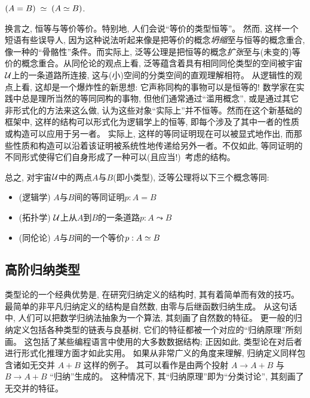 \begin{description}%
\item[泛等公理:]  $(A = B) \;\simeq\; (A \simeq B)$.
\end{description}
%
换言之, 恒等与等价等价。特别地, 人们会说``等价的类型恒等''。
然而, 这样一个短语有些误导人, 因为这种说法听起来像是把等价的概念\emph{坍缩}至与恒等的概念重合, 像一种的``骨骼性''条件。而实际上, 
泛等公理是把恒等的概念\emph{扩张}至与(未变的)等价的概念重合。从同伦论的观点上看, 泛等蕴含着具有相同同伦类型的空间被宇宙$\mathcal{U}$上的一条道路所连接, 这与(小)空间的分类空间的直观理解相符。
从逻辑性的观点上看, 这却是一个爆炸性的新思想: 它声称同构的事物可以是恒等的! 数学家在实践中总是理所当然的等同同构的事物, 但他们通常通过``滥用概念'', 
或是通过其它非形式化的方法来这么做, 认为这些对象``实际上''并不恒等。然而在这个新基础的框架中, 这样的结构可以形式化为逻辑学上的恒等, 即每个涉及了其中一者的性质或构造可以应用于另一者。
实际上, 这样的等同证明现在可以被显式地作出, 而那些性质和构造可以沿着该证明被系统性地传递给另外一者。不仅如此, 等同证明的不同形式使得它们自身形成了一种可以(且应当!)\ 考虑的结构。

总之, 对宇宙$\mathcal{U}$中的两点$A$与$B$(即小类型), 泛等公理将以下三个概念等同:
\begin{itemize}
\item (逻辑学) $A$与$B$间的等同证明$p:A=B$
\item (拓扑学) $\mathcal{U}$上从$A$到$B$的一条道路$p:A \leadsto B$
\item (同伦论) $A$与$B$间的一个等价$p:A \simeq B$
\end{itemize}

\subsection*{高阶归纳类型}%

类型论的一个经典优势是, 在研究归纳定义的结构时, 其有着简单而有效的技巧。
最简单的非平凡归纳定义的结构是自然数, 由零与后继函数归纳生成。
从这句话中, 人们可以把数学归纳法抽象为一个算法, 其刻画了自然数的特征。
更一般的归纳定义包括各种类型的链表与良基树, 它们的特征都被一个对应的``归纳原理''所刻画。
这包括了某些编程语言中使用的大多数数据结构; 正因如此, 类型论在对后者进行形式化推理方面才如此实用。
如果从非常广义的角度来理解, 归纳定义同样包含诸如无交并 $A+B$ 这样的例子。
其可以看作是由两个投射 $A \to A+B$ 与 $B \to A+B$ ``归纳''生成的。
这种情况下, 其``归纳原理''即为``分类讨论'', 其刻画了无交并的特征。

